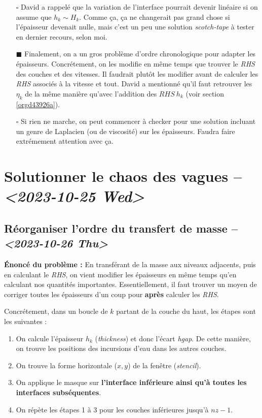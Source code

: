 \documentclass[10pt]{article}
\numberwithin{equation}{section}
\renewcommand{\boxtimes}{\blacksquare}
\begin{document}
\begin{itemize}
\item[{$\square$}] David a rappelé que la variation de l'interface pourrait devenir linéaire si on assume que \(h_k \sim H_k\).
Comme ça, ça ne changerait pas grand chose si l'épaisseur devenait nulle, mais c'est un peu une solution \emph{scotch-tape} à tester en dernier recours, selon moi.\bigskip

\item[{$\boxtimes$}] Finalement, on a un gros problème d'ordre chronologique pour adapter les épaisseurs.
Concrétement, on les modifie en même temps que trouver le \emph{RHS} des couches et des vitesses.
Il faudrait plutôt les modifier avant de calculer les \emph{RHS} associés à la vitesse et tout.
David a mentionné qu'il faut retrouver les \(\eta_k\) de la même manière qu'avec l'addition des \(RHS\ h_k\) (voir section \ref{orgd43926a}). \bigskip

\item[{$\square$}] Si rien ne marche, on peut commencer à checker pour une solution incluant un genre de Laplacien (ou de viscosité) sur les épaisseurs.
Faudra faire extrémement attention avec ça.
\end{itemize}

\section{Solutionner le chaos des vagues -- \textit{<2023-10-25 Wed>}}
\label{sec:org8b2e4d6}

\subsection{Réorganiser l'ordre du transfert de masse -- \textit{<2023-10-26 Thu>}}
\label{sec:org6a2bdc7}
\label{orgd43926a}
\textbf{Énoncé du problème :} En transférant de la masse aux niveaux adjacents, puis en calculant le \emph{RHS}, on vient modifier les épaisseurs en même temps qu'en calculant nos quantités importantes.
Essentiellement, il faut trouver un moyen de corriger toutes les épaisseurs d'un coup pour \textbf{après} calculer les \emph{RHS}. \bigskip

Concrétement, dans un boucle de \(k\) partant de la couche du haut, les étapes sont les suivantes :
\begin{enumerate}
\item On calcule l'épaisseur \(h_k\) (\emph{thickness}) et donc l'écart \emph{hgap}.
De cette manière, on trouve les positions des incursions d'eau dans les autres couches.
\item On trouve la forme horizontale (\(x,y\)) de la fenêtre (\emph{stencil}).
\item On applique le masque sur \textbf{l'interface inférieure ainsi qu'à toutes les interfaces subséquentes}.
\item On répète les étapes 1 à 3 pour les couches inférieures jusqu'à \(nz-1\).\bigskip
\end{enumerate}
\end{document}
